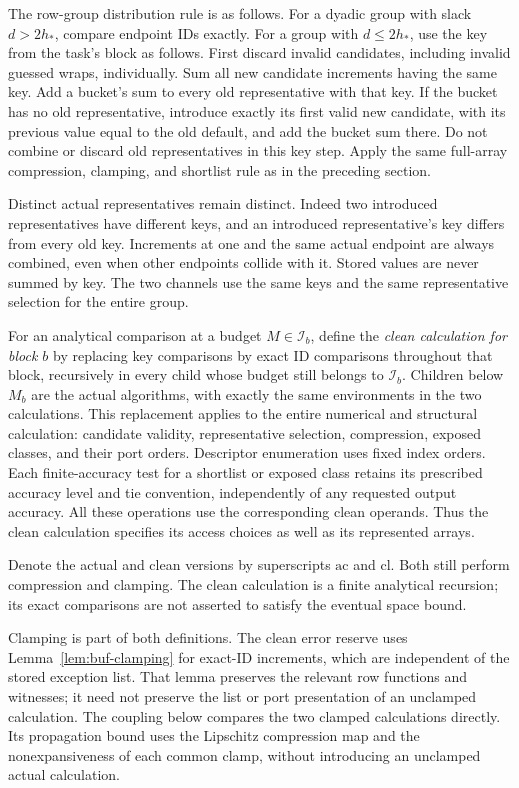 The row-group distribution rule is as follows.
For a dyadic group with slack $d>2h_*$, compare endpoint IDs exactly.  For a
group with $d\le2h_*$, use the key from the task's block as follows.
First discard invalid candidates, including invalid guessed wraps,
individually.  Sum all new candidate increments having the same key.
Add a bucket's sum to every old representative with that key.  If the
bucket has no old representative, introduce exactly its first valid new
candidate, with its previous value equal to the old default, and add the
bucket sum there.  Do not combine or discard old representatives in this
key step.  Apply the same full-array compression, clamping, and shortlist
rule as in the preceding section.

Distinct actual representatives remain distinct.  Indeed two introduced
representatives have different keys, and an introduced representative's
key differs from every old key.  Increments at one and the same actual
endpoint are always combined, even when other endpoints collide with it.
Stored values are never summed by key.  The two channels use the same keys
and the same representative selection for the entire group.

For an analytical comparison at a budget $M\in\mathcal I_b$, define the
\emph{clean calculation for block $b$} by replacing key comparisons by
exact ID comparisons throughout that block, recursively in every child
whose budget still belongs to $\mathcal I_b$.  Children below $M_b$ are
the actual algorithms, with exactly the same environments in the two
calculations.  This replacement applies to the entire numerical and
structural calculation: candidate validity, representative selection,
compression, exposed classes, and their port orders.  Descriptor
enumeration uses fixed index orders.  Each finite-accuracy test for a
shortlist or exposed class retains its prescribed accuracy level and
tie convention, independently of any requested output accuracy.  All
these operations use the corresponding clean operands.  Thus the clean
calculation specifies its access choices as well as its represented
arrays.

Denote the actual and clean versions by superscripts $\mathrm{ac}$ and
$\mathrm{cl}$.  Both still perform compression and clamping.  The clean
calculation is a finite analytical recursion; its exact comparisons are
not asserted to satisfy the eventual space bound.

Clamping is part of both definitions.  The clean error reserve uses
Lemma~\ref{lem:buf-clamping} for exact-ID increments, which are
independent of the stored exception list.  That lemma preserves the
relevant row functions and witnesses; it need not preserve the list or
port presentation of an unclamped calculation.  The coupling below
compares the two clamped calculations directly.  Its propagation bound
uses the Lipschitz compression map and the nonexpansiveness of each
common clamp, without introducing an unclamped actual calculation.

